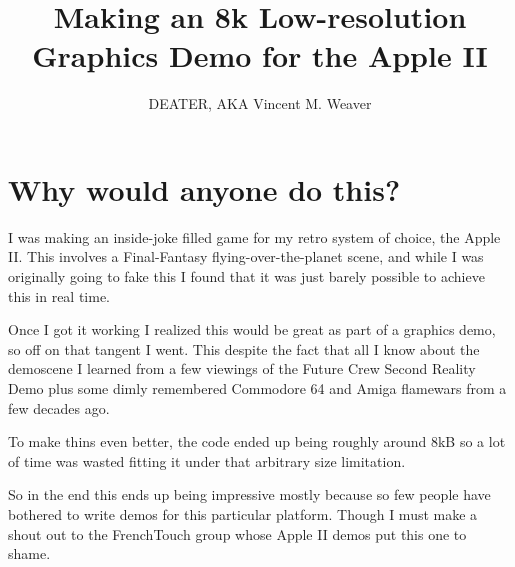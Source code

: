 \documentclass[twocolumn]{article}
\begin{document}
\title{Making an 8k Low-resolution Graphics Demo for the Apple II}
\author{DEATER, AKA Vincent M. Weaver}
\date{}
\maketitle

\section{Why would anyone do this?}

I was making an inside-joke filled game for my retro system of choice,
the Apple II.
This involves a Final-Fantasy flying-over-the-planet scene, and while
I was originally going to fake this I found that it was just barely
possible to achieve this in real time.

Once I got it working I realized this would be great as part of a
graphics demo, so off on that tangent I went.
This despite the fact that all I know about the demoscene I learned
from a few viewings of the Future Crew Second Reality Demo plus some
dimly remembered Commodore 64 and Amiga flamewars from a few decades ago.


To make thins even better, the code ended up being roughly around 8kB so a
lot of time was wasted fitting it under that arbitrary size limitation.

So in the end this ends up being impressive mostly because so few people
have bothered to write demos for this particular platform.
Though I must make a shout out to the FrenchTouch group whose Apple II
demos put this one to shame.



\end{document}
